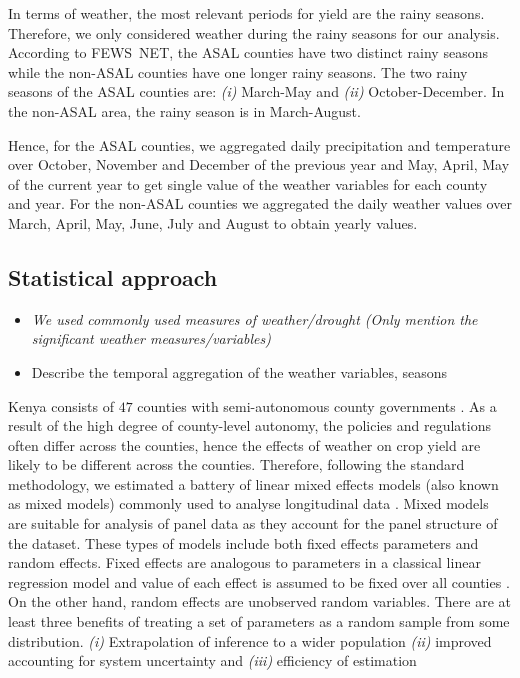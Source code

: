 \documentclass[12pt]{iopart}
\begin{document}
In terms of weather, the most relevant periods for yield are the rainy seasons.
Therefore, we only considered weather during the rainy seasons for our analysis. According to FEWS~NET, the ASAL counties have two distinct rainy seasons while the non-ASAL counties have one longer rainy seasons. The two rainy seasons of the ASAL counties are: \textit{(i)} March-May and \textit{(ii)} October-December. In the non-ASAL area, the rainy season is in March-August. 

Hence, for the ASAL counties, we aggregated daily precipitation and temperature over October, November and December of the previous year and May, April, May of the current year  to get single value of the weather variables for each county and year. For the non-ASAL counties we aggregated the daily weather values over March, April, May, June, July and August to obtain yearly values.

\subsection{Statistical approach}

\begin{itemize}
\color{blue}
\item \textit{We used commonly used measures of weather/drought (Only mention the significant weather measures/variables)}
\item Describe the temporal aggregation of the weather variables, seasons
\end{itemize}
\color{black}

\sloppy
Kenya consists of $47$ counties with semi-autonomous county governments  \cite{Barasa2017}. As a result of the high degree of county-level autonomy, the policies and regulations often differ across the counties, hence the effects of weather on crop yield are likely to be different across the counties. Therefore, following the standard methodology, we estimated a battery of linear mixed effects models (also known as mixed models) commonly used to analyse longitudinal data \cite{bates2000mixed}. Mixed models are suitable for analysis of panel data as they account for the panel structure of the dataset. These types of models include both fixed effects parameters and random effects. Fixed effects are analogous to parameters in a classical linear regression model and value of each effect is assumed to be fixed over all counties \cite{bates2010lme4}. On the other hand, random effects are unobserved random variables. There are at least three benefits of treating a set of parameters as a random sample from some distribution. \textit{(i)} Extrapolation of inference to a wider population \textit{(ii)} improved accounting for system uncertainty and \textit{(iii)} efficiency of estimation %
\end{document}
